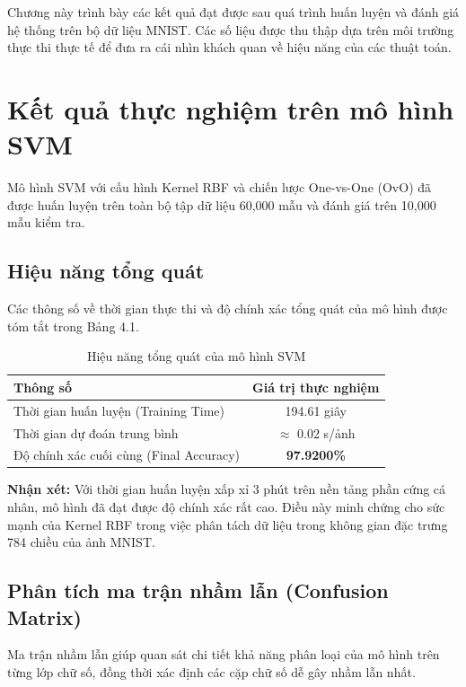 \documentclass[../DoAn.tex]{subfiles}
\begin{document}
Chương này trình bày các kết quả đạt được sau quá trình huấn luyện và đánh giá hệ thống trên bộ dữ liệu MNIST. Các số liệu được thu thập dựa trên môi trường thực thi thực tế để đưa ra cái nhìn khách quan về hiệu năng của các thuật toán.

\section{Kết quả thực nghiệm trên mô hình SVM}

Mô hình SVM với cấu hình Kernel RBF và chiến lược One-vs-One (OvO) đã được huấn luyện trên toàn bộ tập dữ liệu 60,000 mẫu và đánh giá trên 10,000 mẫu kiểm tra.\\

\subsection{Hiệu năng tổng quát}

Các thông số về thời gian thực thi và độ chính xác tổng quát của mô hình được tóm tắt trong Bảng 4.1.

\begin{table}[H]
\centering
\caption{Hiệu năng tổng quát của mô hình SVM}
\label{tab:svm_general_perf}
\begin{tabular}{|l|c|}
\hline
\textbf{Thông số} & \textbf{Giá trị thực nghiệm} \\ \hline
Thời gian huấn luyện (Training Time) & 194.61 giây \\ \hline
Thời gian dự đoán trung bình & $\approx$ 0.02 s/ảnh \\ \hline
Độ chính xác cuối cùng (Final Accuracy) & \textbf{97.9200\%} \\ \hline
\end{tabular}
\end{table}

\textbf{Nhận xét:} Với thời gian huấn luyện xấp xỉ 3 phút trên nền tảng phần cứng cá nhân, mô hình đã đạt được độ chính xác rất cao. Điều này minh chứng cho sức mạnh của Kernel RBF trong việc phân tách dữ liệu trong không gian đặc trưng 784 chiều của ảnh MNIST.\\

\subsection{Phân tích ma trận nhầm lẫn (Confusion Matrix)}

Ma trận nhầm lẫn giúp quan sát chi tiết khả năng phân loại của mô hình trên từng lớp chữ số, đồng thời xác định các cặp chữ số dễ gây nhầm lẫn nhất.
\end{document}
